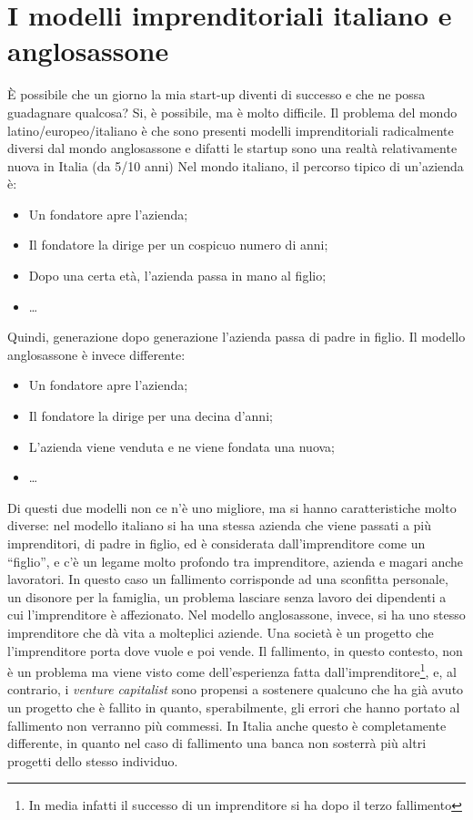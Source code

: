 \section{I modelli imprenditoriali italiano e anglosassone}
È possibile che un giorno la mia start-up diventi di successo e che ne possa
guadagnare qualcosa? Si, è possibile, ma è molto difficile.
Il problema del mondo latino/europeo/italiano è che sono presenti modelli
imprenditoriali radicalmente diversi dal mondo anglosassone e difatti
le startup sono una realtà relativamente nuova in Italia (da 5/10 anni)
Nel mondo italiano, il percorso tipico di un'azienda è:
\begin{itemize}
 \item Un fondatore apre l'azienda;
 \item Il fondatore la dirige per un cospicuo numero di anni;
 \item Dopo una certa età, l'azienda passa in mano al figlio;
 \item \dots
\end{itemize}
Quindi, generazione dopo generazione l'azienda passa di padre in figlio.
Il modello anglosassone è invece differente:
\begin{itemize}
 \item Un fondatore apre l'azienda;
 \item Il fondatore la dirige per una decina d'anni;
 \item L'azienda viene venduta e ne viene fondata una nuova;
 \item \dots
\end{itemize}
Di questi due modelli non ce n'è uno migliore, ma si hanno caratteristiche
molto diverse: nel modello italiano si ha una stessa azienda che viene passati
a più imprenditori, di padre in figlio, ed è considerata dall'imprenditore come
un ``figlio'', e c'è un legame molto profondo tra imprenditore, azienda e
magari anche lavoratori. In questo caso un fallimento corrisponde ad una
sconfitta personale, un disonore per la famiglia, un problema lasciare senza
lavoro dei dipendenti a cui l'imprenditore è affezionato. Nel modello
anglosassone, invece, si ha uno stesso imprenditore che dà vita a molteplici
aziende. Una società è un progetto che l'imprenditore porta dove vuole e poi
vende. Il fallimento, in questo contesto, non è un problema ma viene visto come
dell'esperienza fatta dall'imprenditore\footnote{In media infatti il successo
di un imprenditore si ha dopo il terzo fallimento}, e, al contrario, i 
\textit{venture capitalist} sono propensi a sostenere qualcuno che ha già avuto
un progetto che è fallito in quanto, sperabilmente, gli errori che hanno
portato al fallimento non verranno più commessi. In Italia anche questo è
completamente differente, in quanto nel caso di fallimento una banca non
sosterrà più altri progetti dello stesso individuo.
